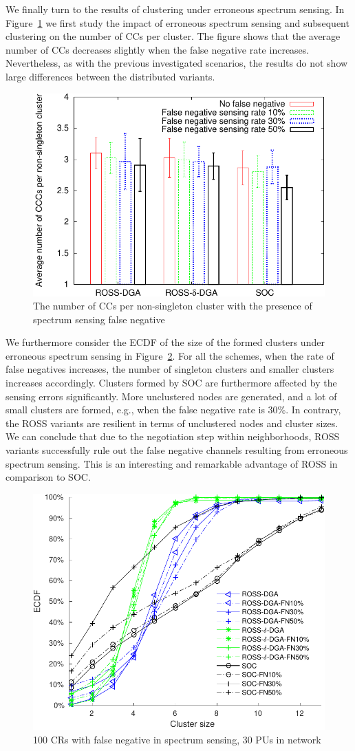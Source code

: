 \documentclass[times]{ettauth}
\newcommand{\eg}{e.g., }
\theoremstyle{mytheoremstyle}
\theoremstyle{mytheoremstyle}
\theoremstyle{mytheoremstyle}
\begin{document}
We finally turn to the results of clustering under erroneous spectrum sensing.
In Figure~\ref{false_negative_ccc} we first study the impact of erroneous spectrum sensing and subsequent clustering on the number of CCs per cluster.
The figure shows that the average number of CCs decreases slightly when the false negative rate increases.
Nevertheless, as with the previous investigated scenarios, the results do not show large differences between the distributed variants.
\begin{figure}[!h]
  \centering
   \includegraphics[width=0.7\linewidth]{false_negative.pdf}
  \caption{The number of CCs per non-singleton cluster with the presence of spectrum sensing false negative}
  \label{false_negative_ccc}
\end{figure}
We furthermore consider the ECDF of the size of the formed clusters under erroneous spectrum sensing in Figure~\ref{false_negative_CDF}.
For all the schemes, when the rate of false negatives increases, the number of singleton clusters and smaller clusters increases accordingly.
Clusters formed by SOC are furthermore affected by the sensing errors significantly.
More unclustered nodes are generated, and a lot of small clusters are formed, \eg when the false negative rate is 30\%.
In contrary, the ROSS variants are resilient in terms of unclustered nodes and cluster sizes.
We can conclude that due to the negotiation step within neighborhoods, ROSS variants successfully rule out the false negative channels resulting from erroneous spectrum sensing. 
This is an interesting and remarkable advantage of ROSS in comparison to SOC.
\begin{figure}[!h]
  \centering
   \includegraphics[width=0.7\linewidth]{draw_cdf_clusterSize_with_false_negative.pdf}
  \caption{100 CRs with false negative in spectrum sensing, 30 PUs in network}
  \label{false_negative_CDF}
\end{figure}
\end{document}

